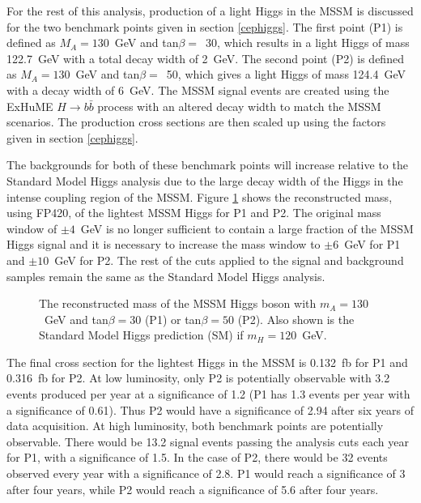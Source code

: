 For the rest of this analysis, production of a light Higgs in the MSSM is discussed for the two benchmark points given in section \ref{cephiggs}. The first point (P1) is defined as $M_A=130$~GeV and tan$\beta=$~30, which results in a light Higgs of mass 122.7~GeV with a total decay width of 2~GeV. The second point (P2) is defined as $M_A=130$~GeV and tan$\beta=$~50, which gives a light Higgs of mass 124.4~GeV with a decay width of 6~GeV. The MSSM signal events are created using the ExHuME $H\rightarrow b\bar{b}$ process with an altered decay width to match the MSSM scenarios. The production cross sections are then scaled up using the factors given in section \ref{cephiggs}. 

The backgrounds for both of these benchmark points will increase relative to the Standard Model Higgs analysis due to the large decay width of the Higgs in the intense coupling region of the MSSM. Figure \ref{mssmmass} shows the reconstructed mass, using FP420, of the lightest MSSM Higgs for P1 and P2.  The original mass window of $\pm4$~GeV is no longer sufficient to contain a large fraction of the MSSM Higgs signal and it is necessary to increase the mass window to $\pm6$~GeV for P1 and $\pm10$~GeV for P2. The rest of the cuts applied to the signal and background samples remain the same as the Standard Model Higgs analysis.


\begin{figure}
\centering
\caption[The reconstructed mass of the MSSM Higgs]{The reconstructed mass of the MSSM Higgs boson with $m_A=130$~GeV and tan$\beta=30$ (P1) or tan$\beta=50$ (P2). Also shown is the Standard Model Higgs prediction (SM) if $m_H=120$~GeV.\label{mssmmass}}
\end{figure}

The final cross section for the lightest Higgs in the MSSM is  0.132~fb for P1 and 0.316~fb for P2. 
At  low luminosity, only P2 is potentially observable with 3.2 events produced per year at a significance of 1.2 (P1 has 1.3 events per year with a significance of 0.61). Thus P2 would have a significance of 2.94 after six years of data acquisition. At high luminosity, both benchmark points are potentially observable. There would be 13.2 signal events passing the analysis cuts each year for P1, with a significance of 1.5. In the case of P2, there would be 32 events observed every year with a significance of 2.8. P1 would reach a significance of 3 after four years, while P2 would reach a significance of 5.6 after four years.

